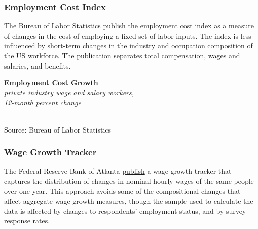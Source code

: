 \documentclass{report}
\makeatletter
\newcommand{\tbllink}[1]{\href{https://raw.githubusercontent.com/bdecon/US-chartbook/master/chartbook/data/#1}{\faTable}}
\newcommand*\short[1]{\expandafter\@gobbletwo\number\numexpr#1\relax}
\newcommand{\stdnode}[3]{\node[below, align=left, shift=({#1,#2})]{#3};}
\newcommand{\dateaxisticks}{
		date coordinates in=x, axis line style={draw=none},
		xmax={2021-05-15},
		max space between ticks=40,	    
		xtick={{1990-01-01}, {1992-01-01}, {1994-01-01}, 
			{1996-01-01}, {1998-01-01}, {2000-01-01}, 
			{2002-01-01}, {2004-01-01}, {2006-01-01},
			{2008-01-01}, {2010-01-01}, {2012-01-01}, {2014-01-01},
		    {2016-01-01}, {2018-01-01}, {2020-01-01}},
		minor xtick={{1989-01-01}, {1991-01-01}, {1993-01-01},
			{1995-01-01}, {1997-01-01}, {1999-01-01}, 
			{2001-01-01}, {2003-01-01}, {2005-01-01}, {2007-01-01},
		    {2009-01-01}, {2011-01-01}, {2013-01-01}, {2015-01-01},
		    {2017-01-01}, {2019-01-01}, {2021-01-01}},
		enlarge y limits={0.06}, enlarge x limits={0.01},
		}
\newcommand{\bbar}[2]{extra #1 ticks = {{#2}}, extra #1 tick labels = ,
		extra #1 tick style = {grid=major, grid style={thick, black!25}},}
\newcommand{\stdline}[4]{\addplot[very thick, no markers, color=#1] 
		table [x=#2, y=#3, col sep=comma] {#4};	}
\newcommand{\rebars}{
		\fill[color=black!10] (axis cs:{2007-12-01},\pgfkeysvalueof{/pgfplots/ymin}) rectangle 
			(axis cs:{2009-07-01}, \pgfkeysvalueof{/pgfplots/ymax});
		\fill[color=black!10] (axis cs:{2001-03-01},\pgfkeysvalueof{/pgfplots/ymin}) rectangle 
			(axis cs:{2001-11-01}, \pgfkeysvalueof{/pgfplots/ymax});
		\fill[color=black!10] (axis cs:{2020-02-01},\pgfkeysvalueof{/pgfplots/ymin}) rectangle 
			(axis cs:{2021-05-15}, \pgfkeysvalueof{/pgfplots/ymax});}
\makeatother
\begin{document}
{{\begin{minipage}{0.76\textwidth}
\subsubsection*{\color{black!70} \seriffont Employment Cost Index}
\small The Bureau of Labor Statistics \href{https://www.bls.gov/news.release/eci.nr0.htm}{publish} the employment cost index as a measure of changes in the cost of employing a fixed set of labor inputs. The index is less influenced by short-term changes in the industry and occupation composition of the US workforce. The publication separates total compensation, wages and salaries, and benefits.
\end{minipage}

\begin{minipage}{0.44\textwidth}
\normalsize \textbf{Employment Cost Growth}\\
\footnotesize{\textit{private industry wage and salary workers,}}\\
\footnotesize{\textit{12-month percent change}}\\
\hspace*{-2mm} \\
\footnotesize{Source: Bureau of Labor Statistics} \hfill \tbllink{eci.csv}
\end{minipage} \hspace{6mm} \begin{minipage}{0.27\textwidth}
\small 
\end{minipage}
\newpage
\subsubsection*{\color{black!70} \seriffont Wage Growth Tracker}
\begin{minipage}{0.76\textwidth}
\small The Federal Reserve Bank of Atlanta \href{https://www.frbatlanta.org/chcs/wage-growth-tracker}{publish} a wage growth tracker that captures the distribution of changes in nominal hourly wages of the same people over one year. This approach avoids some of the compositional changes that affect aggregate wage growth measures, though the sample used to calculate the data is affected by changes to respondents' employment status, and by survey response rates. 


\end{minipage}}}
\end{document}

